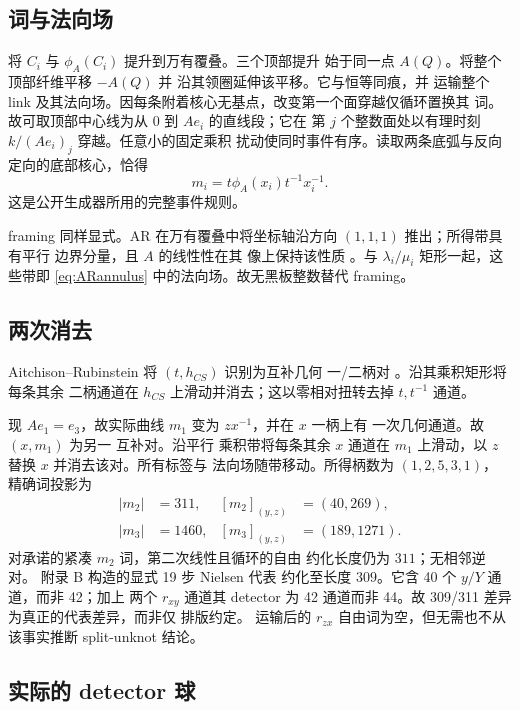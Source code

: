 \documentclass[11pt]{amsart}
\theoremstyle{definition}
\theoremstyle{remark}
\begin{document}
\subsection{词与法向场}

将 $C_i$ 与 $\phi_A(C_i)$ 提升到万有覆叠。三个顶部提升
始于同一点 $A(Q)$。将整个顶部纤维平移 $-A(Q)$ 并
沿其领圈延伸该平移。它与恒等同痕，并
运输整个 link 及其法向场。因每条附着核心无基点，改变第一个面穿越仅循环置换其
词。故可取顶部中心线为从 $0$ 到 $Ae_i$ 的直线段；它在
第 $j$ 个整数面处以有理时刻 $k/(Ae_i)_j$ 穿越。任意小的固定乘积
扰动使同时事件有序。读取两条底弧与反向定向的底部核心，恰得
\begin{equation}\label{eq:actualword}
m_i=t\phi_A(x_i)t^{-1}x_i^{-1}.
\end{equation}
这是公开生成器所用的完整事件规则。

framing 同样显式。AR 在万有覆叠中将坐标轴沿方向 $(1,1,1)$ 推出；所得带具有平行
边界分量，且 $A$ 的线性性在其
像上保持该性质 \cite[pp.~16--17]{AitchisonRubinstein1984}。与
$\lambda_i/\mu_i$ 矩形一起，这些带即 \eqref{eq:ARannulus} 中的法向场。故无黑板整数替代
framing。

\subsection{两次消去}

Aitchison--Rubinstein 将 $(t,h_{CS})$ 识别为互补几何
一/二柄对 \cite[p.~7]{AitchisonRubinstein1984}。沿其乘积矩形将每条其余
二柄通道在 $h_{CS}$ 上滑动并消去；这以零相对扭转去掉 $t,t^{-1}$ 通道。

现 $Ae_1=e_3$，故实际曲线 $m_1$ 变为 $zx^{-1}$，并在 $x$ 一柄上有
一次几何通道。故 $(x,m_1)$ 为另一
互补对。沿平行
乘积带将每条其余 $x$ 通道在 $m_1$ 上滑动，以 $z$ 替换 $x$ 并消去该对。所有标签与
法向场随带移动。所得柄数为 $(1,2,5,3,1)$，
精确词投影为
\[
\begin{aligned}
|m_2|&=311, & [m_2]_{(y,z)}&=(40,269),\\
|m_3|&=1460, & [m_3]_{(y,z)}&=(189,1271).
\end{aligned}
\]
对承诺的紧凑 $m_2$ 词，第二次线性且循环的自由
约化长度仍为 $311$；无相邻逆对。
附录 B 构造的显式 19 步 Nielsen 代表
约化至长度 $309$。它含 40 个 $y/Y$ 通道，而非 42；加上
两个 $r_{xy}$ 通道其 detector 为 42 通道而非 44。故
309/311 差异为真正的代表差异，而非仅
排版约定。
运输后的 $r_{zx}$ 自由词为空，但无需也不从该事实推断 split-unknot 结论。

\subsection{实际的 detector 球}
\end{document}
